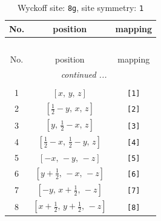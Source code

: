 \documentclass[fleqn,8pt]{jsarticle}
\begin{document}
\renewcommand{\arraystretch}{1.2}
\begin{longtable}{ccc}
\caption{Wyckoff site: {\tt 8g}, site symmetry: {\tt 1}}
 \\
 \hline \hline
No. & position & mapping \\ \hline \endfirsthead

\multicolumn{2}{l}{\tablename\ \thetable{}} \\
 \hline \hline
No. & position & mapping \\ \hline \endhead

 \hline \hline
\multicolumn{2}{r}{\footnotesize\it continued ...} \\ \endfoot

 \hline \hline
\multicolumn{2}{r}{} \\ \endlastfoot

1 & $\left[ x,\, y,\, z \right]$ & {\tt [1]} \\ \hline
2 & $\left[ \frac{1}{2} - y,\, x,\, z \right]$ & {\tt [2]} \\ \hline
3 & $\left[ y,\, \frac{1}{2} - x,\, z \right]$ & {\tt [3]} \\ \hline
4 & $\left[ \frac{1}{2} - x,\, \frac{1}{2} - y,\, z \right]$ & {\tt [4]} \\ \hline
5 & $\left[ - x,\, - y,\, - z \right]$ & {\tt [5]} \\ \hline
6 & $\left[ y + \frac{1}{2},\, - x,\, - z \right]$ & {\tt [6]} \\ \hline
7 & $\left[ - y,\, x + \frac{1}{2},\, - z \right]$ & {\tt [7]} \\ \hline
8 & $\left[ x + \frac{1}{2},\, y + \frac{1}{2},\, - z \right]$ & {\tt [8]} \\
\end{longtable}
\end{document}
